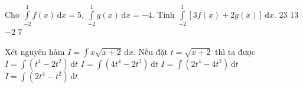 \begin{ex}%
	Cho $\displaystyle\int\limits_{-2}^{1} f(x) \mathrm{\,d}x=5$, $\displaystyle\int\limits_{-2}^{1} g(x) \mathrm{\,d}x=-4$. Tính $\displaystyle\int\limits_{-2}^{1} \left[3f(x)+2g(x) \right] \mathrm{\,d}x$.
	\choice
	{ $23$}
	{$13$}
	{$-2$}
	{\True $7$}
\end{ex} 
\begin{ex}%
Xét nguyên hàm $I=\displaystyle\int\limits x\sqrt{x+2}\mathrm{\,d}x$. Nếu đặt $t=\sqrt{x+2}$ thì ta được
	\choice
	{ $I=\displaystyle\int\limits \left(t^4-2t^2 \right) \mathrm{\,d}t$}
	{$I=\displaystyle\int\limits \left(4t^4-2t^2 \right) \mathrm{\,d}t$}
	{\True $I=\displaystyle\int\limits \left(2t^4-4t^2 \right) \mathrm{\,d}t$}
	{$I=\displaystyle\int\limits \left(2t^4-t^2 \right) \mathrm{\,d}t$}
\end{ex} 

